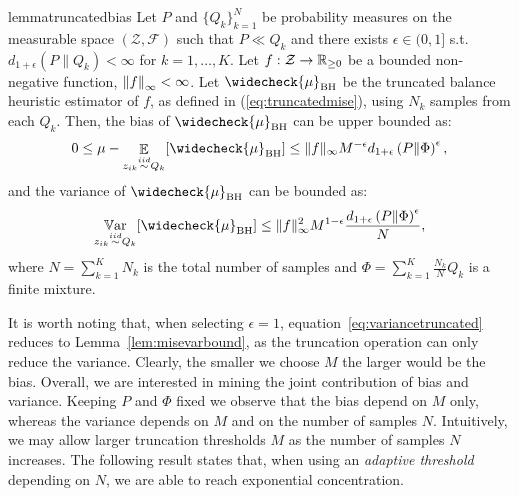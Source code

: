 \documentclass{article}
\begin{document}
\begin{restatable}{lemma}{truncatedbias}\label{lem:truncatedbias}
	Let $P$ and $\{ Q_k \}_{k=1}^N$ be probability measures on the measurable space $(\mathcal{Z},\mathcal{F})$ such that $P\ll Q_k$ and there exists $\epsilon \in (0,1]$ s.t. $d_{1+\epsilon}(P\|Q_k)<\infty$ for $k=1,\dots,K$. Let $f:\mathcal{Z}\to\Reals_{\ge 0}$ be a bounded non-negative function, \ie $\norm[\infty]{f}<\infty$. Let $\widecheck{\mu}_{\text{BH}}$ be the truncated balance heuristic estimator of $f$, as defined in (\ref{eq:truncatedmise}), using $N_k$ \iid samples from each $Q_k$. Then, the bias of $\widecheck{\mu}_{\text{BH}}$ can be upper bounded as:
	 \begin{equation}
         0 \le \mu - \Exp_{z_{ik} \simiid Q_k} [\widecheck{\mu}_{\text{BH}}] \le  \|f\|_{\infty} M^{-\epsilon} d_{1+\epsilon}\left( P \| \Phi \right)^{\epsilon},
    \end{equation}
    and the variance of $\widecheck{\mu}_{\text{BH}}$ can be bounded as:
    \begin{equation}
    \label{eq:variancetruncated}
         \Var_{z_{ik} \simiid Q_k} [\widecheck{\mu}_{\text{BH}}] \le  \|f\|_{\infty}^2 M^{1-\epsilon} \frac{d_{1+\epsilon}\left( P \| \Phi \right)^{\epsilon}}{N},
    \end{equation}
	where ${N=\sum_{k=1}^{K}N_k}$ is the total number of samples and ${\Phi=\sum_{k=1}^K\frac{N_k}{N}Q_k}$ is a finite mixture.
\end{restatable}
%
It is worth noting that, when selecting $\epsilon=1$, equation~\eqref{eq:variancetruncated} reduces to Lemma~\ref{lem:misevarbound}, as the truncation operation can only reduce the variance. Clearly, the smaller we choose $M$ the larger would be the bias. Overall, we are interested in mining the joint contribution of bias and variance. Keeping $P$ and $\Phi$ fixed we observe that the bias depend on $M$ only, whereas the variance depends on $M$ and on the number of samples $N$. Intuitively, we may allow larger truncation thresholds $M$ as the number of samples $N$ increases. The following result states that, when using an \emph{adaptive threshold} depending on $N$, we are able to reach exponential concentration.
\end{document}
